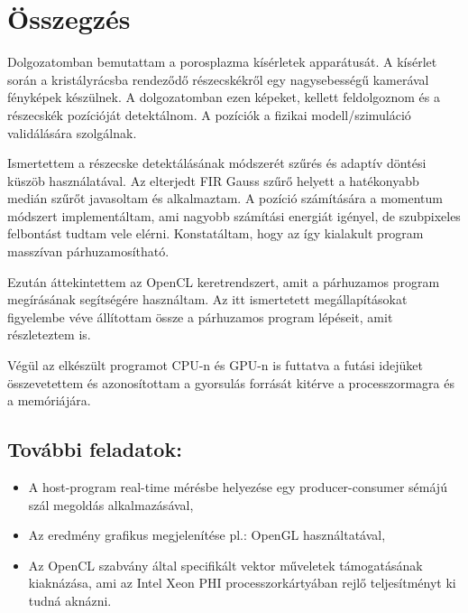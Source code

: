\chapter{Összegzés}
\cbstart
	Dolgozatomban bemutattam a porosplazma kísérletek apparátusát. A kísérlet során a kristályrácsba
	rendeződő részecskékről egy nagysebességű kamerával fényképek készülnek. A dolgozatomban ezen
	képeket, kellett feldolgoznom és a részecskék pozícióját detektálnom.
	A pozíciók a fizikai modell/szimuláció validálására szolgálnak.
	
	Ismertettem a részecske detektálásának módszerét szűrés és adaptív döntési küszöb használatával.
	Az elterjedt FIR Gauss szűrő helyett a hatékonyabb medián szűrőt javasoltam és alkalmaztam. A
	pozíció számítására a momentum módszert implementáltam, ami nagyobb számítási energiát igényel, de
	szubpixeles felbontást tudtam vele elérni. Konstatáltam, hogy az így kialakult program masszívan párhuzamosítható.
	
	Ezután áttekintettem az OpenCL keretrendszert, amit a párhuzamos program megírásának segítségére
	használtam. Az itt ismertetett megállapításokat figyelembe véve állítottam össze a párhuzamos
	program lépéseit, amit részleteztem is.
	
	Végül az elkészült programot CPU-n és GPU-n is futtatva a futási idejüket összevetettem és
	azonosítottam a gyorsulás forrását kitérve a processzormagra és a memóriájára.
	
	\section*{További feladatok:}
	\begin{itemize}
		\item A host-program real-time mérésbe helyezése egy producer-consumer sémájú szál megoldás
		alkalmazásával,
		\item Az eredmény grafikus  megjelenítése pl.: OpenGL használtatával,
		\item Az OpenCL szabvány által specifikált vektor műveletek támogatásának kiaknázása, ami az Intel
		Xeon PHI processzorkártyában rejlő teljesítményt ki tudná aknázni.
	\end{itemize}
	
\cbend